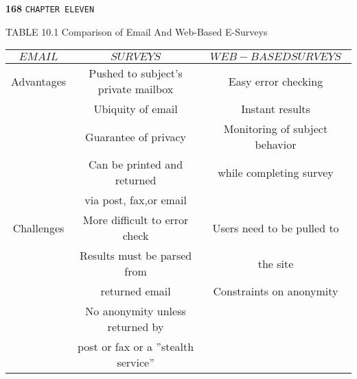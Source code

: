 \documentclass[a4,12pt]{book}
\begin{document}
\newpage
\begin{flushleft}
\textbf{168}\hspace*{1cm} \texttt{CHAPTER ELEVEN}
\end{flushleft}

\vspace*{0.5cm}
\begin{flushleft}
TABLE 10.1 Comparison of Email And Web-Based E-Surveys
\begin{tabular}{ccc}

 \hline

 \hline

 \hline

 \hline

 $EMAIL$ &  $SURVEYS$ & $WEB-BASED SURVEYS$\\
\hline
Advantages  &  Pushed to subject's private mailbox  &  Easy error checking \\
            &  Ubiquity of email                    &  Instant results \\
            &  Guarantee of privacy                 &  Monitoring of subject behavior \\
            &  Can be printed and returned          &  \hspace*{0.2cm} while completing survey\\
            &  \hspace*{0.2cm} via post, fax,or email&                                       \\
  \vspace*{0.2cm}
Challenges  &  More difficult to error check        &  Users need to be pulled to\\
            &  Results must be parsed from          &  \hspace*{0.2cm} the site \\
            &  \hspace*{0.2cm} returned email       &  Constraints on anonymity \\
            &  No anonymity unless returned by      &                           \\
            &  \hspace*{0.2cm} post or fax or a ''stealth service'' &           \\
 \hline

 \hline

 \hline

 \hline
\end{tabular}
\end{flushleft}
\end{document}
